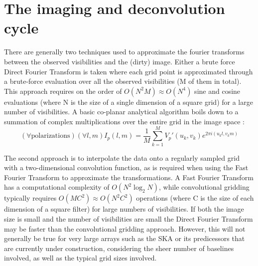 \documentclass[a4paper,10pt]{report}
\begin{document}
 \section{The imaging and deconvolution cycle}
 There are generally two techniques used to approximate the fourier transforms between the observed visibilities and the (dirty) image. Either a brute force Direct Fourier Transform is taken where each grid point is approximated through a brute-force
 evaluation over all the observed visibilities (M of them in total). This approach requires on the order of $O(N^2M) \approx O(N^4)$ sine and cosine evaluations (where N is the size of a single dimension of a square grid) for a large number of visibilities. A basic co-planar analytical 
 algorithm boils down to a summation of complex multiplications over the entire grid in the image space \cite[Lecture 7]{taylor1999synthesis}: 
 \begin{equation}
  (\forall \text{polarizations})(\forall l,m) I_{p}(l,m) = \frac{1}{M}\sum_{k=1}^{M}{V_p'(u_k,v_k)e^{2\pi i (u_kl,v_km)}}
 \end{equation}
 
 The second approach is to interpolate the data onto a regularly sampled grid with a two-dimensional convolution function, as is required when using the Fast Fourier Transform to approximate the transformations. A Fast Fourier Transform has a computational complexity of $O(N^2\log_2{N})$, while
 convolutional gridding typically requires $O(MC^2) \approx O(N^2C^2)$ operations (where C is the size of each dimension of a square filter) for large numbers of visibilities. If both the image size is small and the number of visibilities 
 are small the Direct Fourier Transform may be faster than the convolutional gridding approach. However, this will not generally be true for very large arrays such as the SKA or its predicessors that are currently under construction, 
 considering the sheer number of baselines involved, as well as the typical grid sizes involved.
 
\end{document}

